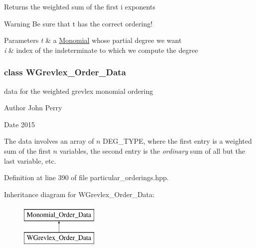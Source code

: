 \begin{DoxyReturn}{Returns}
the weighted sum of the first i exponents 
\end{DoxyReturn}
\begin{DoxyWarning}{Warning}
Be sure that {\ttfamily t} has the correct ordering! 
\end{DoxyWarning}

\begin{DoxyParams}{Parameters}
{\em t} & a \hyperlink{group__polygroup_class_monomial}{Monomial} whose partial degree we want \\
\hline
{\em i} & index of the indeterminate to which we compute the degree \\
\hline
\end{DoxyParams}
\label{class_w_grevlex___order___data}
\subsubsection{class W\+Grevlex\+\_\+\+Order\+\_\+\+Data}
data for the weighted grevlex monomial ordering 

\begin{DoxyAuthor}{Author}
John Perry 
\end{DoxyAuthor}
\begin{DoxyDate}{Date}
2015
\end{DoxyDate}
The data involves an array of $n$ {\ttfamily D\+E\+G\+\_\+\+T\+Y\+PE}, where the first entry is a weighted sum of the first $n$ variables, the second entry is the {\itshape ordinary} sum of all but the last variable, etc. 

Definition at line 390 of file particular\+\_\+orderings.\+hpp.

Inheritance diagram for W\+Grevlex\+\_\+\+Order\+\_\+\+Data\+:\begin{figure}[H]
\begin{center}
\leavevmode
\includegraphics[height=2.000000cm]{group__orderinggroup}
\end{center}
\end{figure}
